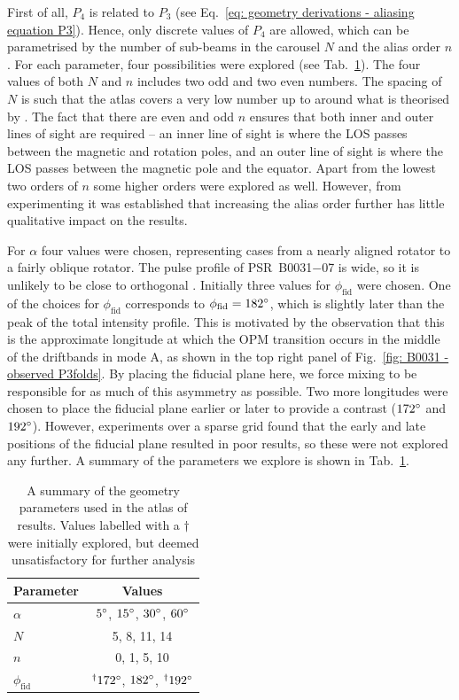 First of all, $P_4$ is related to $P_3$ (see Eq.~\ref{eq: geometry derivations - aliasing equation P3}). Hence, only discrete values of $P_4$ are allowed, which can be parametrised by the number of sub-beams in the carousel $N$ and the alias order $n$. For each parameter, four possibilities were explored (see Tab.~\ref{tab: atlas parameters}). The four values of both $N$ and $n$ includes two odd and two even numbers. The spacing of $N$ is such that the atlas covers a very low number up to around what is theorised by \citet{MBW+2019}. The fact that there are even and odd $n$ ensures that both inner and outer lines of sight are required -- an inner line of sight is where the LOS passes between the magnetic and rotation poles, and an outer line of sight is where the LOS passes between the magnetic pole and the equator. Apart from the lowest two orders of $n$ some higher orders were explored as well. However, from experimenting it was established that increasing the alias order further has little qualitative impact on the results.

For $\alpha$ four values were chosen, representing cases from a nearly aligned rotator to a fairly oblique rotator. The pulse profile of PSR~B0031$-$07 is wide, so it is unlikely to be close to orthogonal \citep[e.g.][]{SMS+2007}. Initially three values for $\phi_\mathrm{fid}$ were chosen. One of the choices for $\phi_\mathrm{fid}$ corresponds to $\phi_\mathrm{fid} = 182^\circ$, which is slightly later than the peak of the total intensity profile. This is motivated by the observation that this is the approximate longitude at which the OPM transition occurs in the middle of the driftbands in mode A, as shown in the top right panel of Fig.~\ref{fig: B0031 - observed P3folds}. By placing the fiducial plane here, we force mixing to be responsible for as much of this asymmetry as possible. Two more longitudes were chosen to place the fiducial plane earlier or later to provide a contrast ($172^\circ$ and $192^\circ$). However, experiments over a sparse grid found that the early and late positions of the fiducial plane resulted in poor results, so these were not explored any further. A summary of the parameters we explore is shown in Tab.~\ref{tab: atlas parameters}. 
\begin{table}
    \centering
    \caption[Summary of the atlas geometry parameters]{A summary of the geometry parameters used in the atlas of results. Values labelled with a $\dagger$ were initially explored, but deemed unsatisfactory for further analysis}
    \label{tab: atlas parameters}
    \begin{tabular}{lc}
        \hline
        Parameter & Values  \\
        \hline
        $\alpha$ & $5^\circ$, $15^\circ$, $30^\circ$, $60^\circ$ \\
        $N$ & 5, 8, 11, 14 \\
        $n$ & 0, 1, 5, 10 \\
        $\phi_\mathrm{fid}$ & $^\dagger172^\circ$, $182^\circ$, $^\dagger192^\circ$ 
    \end{tabular}
\end{table}

